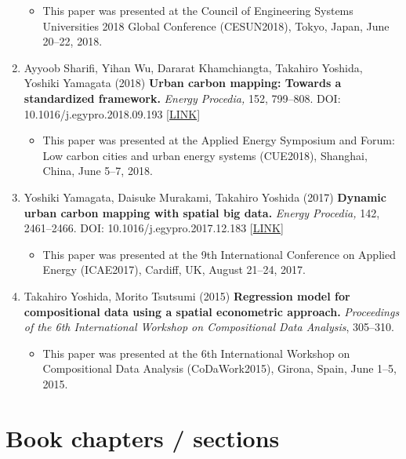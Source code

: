 \documentclass[
]{book}
\providecommand{\tightlist}{%
  \setlength{\itemsep}{0pt}\setlength{\parskip}{0pt}}
\begin{document}
\begin{enumerate}
  \begin{itemize}
  \tightlist
  \item
    This paper was presented at the Council of Engineering Systems Universities 2018 Global Conference (CESUN2018), Tokyo, Japan, June 20--22, 2018.
  \end{itemize}
\item
  Ayyoob Sharifi, Yihan Wu, Dararat Khamchiangta, Takahiro Yoshida, Yoshiki Yamagata (2018)
  \textbf{Urban carbon mapping: Towards a standardized framework.}
  \emph{Energy Procedia,} 152, 799--808.
  DOI: 10.1016/j.egypro.2018.09.193 {[}\href{https://www.sciencedirect.com/science/article/pii/S1876610218307379}{LINK}{]}

  \begin{itemize}
  \tightlist
  \item
    This paper was presented at the Applied Energy Symposium and Forum: Low carbon cities and urban energy systems (CUE2018), Shanghai, China, June 5--7, 2018.
  \end{itemize}
\item
  Yoshiki Yamagata, Daisuke Murakami, Takahiro Yoshida (2017)
  \textbf{Dynamic urban carbon mapping with spatial big data.}
  \emph{Energy Procedia,} 142, 2461--2466.
  DOI: 10.1016/j.egypro.2017.12.183 {[}\href{https://www.sciencedirect.com/science/article/pii/S1876610217359131}{LINK}{]}

  \begin{itemize}
  \tightlist
  \item
    This paper was presented at the 9th International Conference on Applied Energy (ICAE2017), Cardiff, UK, August 21--24, 2017.
  \end{itemize}
\item
  Takahiro Yoshida, Morito Tsutsumi (2015)
  \textbf{Regression model for compositional data using a spatial econometric approach.}
  \emph{Proceedings of the 6th International Workshop on Compositional Data Analysis}, 305--310.

  \begin{itemize}
  \tightlist
  \item
    This paper was presented at the 6th International Workshop on Compositional Data Analysis (CoDaWork2015), Girona, Spain, June 1--5, 2015.
  \end{itemize}
\end{enumerate}

\section*{Book chapters / sections}\label{book-chapters-sections}
\end{document}
